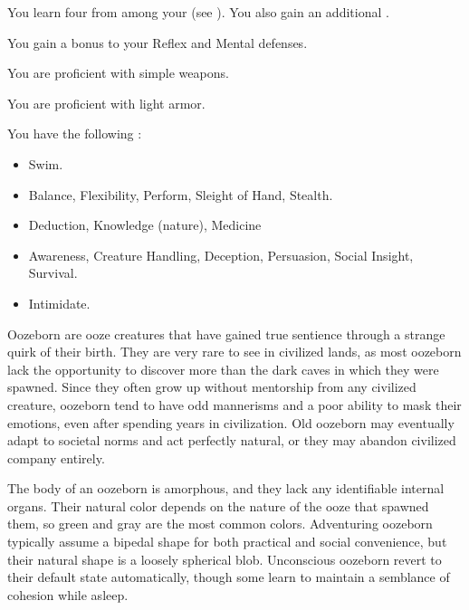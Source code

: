       You learn four  from among your  (see ). You also gain an additional .

      You gain a  bonus to your Reflex and Mental defenses.

      You are proficient with simple weapons.

      You are proficient with light armor.

      You have the following :
      \begin{itemize}
        \item {} Swim.
        \item {} Balance, Flexibility, Perform, Sleight of Hand, Stealth.
        \item {} Deduction, Knowledge (nature), Medicine
        \item {} Awareness, Creature Handling, Deception, Persuasion, Social Insight, Survival.
        \item {} Intimidate.
      \end{itemize}

  Oozeborn are ooze creatures that have gained true sentience through a strange quirk of their birth.
  They are very rare to see in civilized lands, as most oozeborn lack the opportunity to discover more than the dark caves in which they were spawned.
  Since they often grow up without mentorship from any civilized creature, oozeborn tend to have odd mannerisms and a poor ability to mask their emotions, even after spending years in civilization.
  Old oozeborn may eventually adapt to societal norms and act perfectly natural, or they may abandon civilized company entirely.

  The body of an oozeborn is amorphous, and they lack any identifiable internal organs.
  Their natural color depends on the nature of the ooze that spawned them, so green and gray are the most common colors.
  Adventuring oozeborn typically assume a bipedal shape for both practical and social convenience, but their natural shape is a loosely spherical blob.
  Unconscious oozeborn revert to their default state automatically, though some learn to maintain a semblance of cohesion while asleep.

